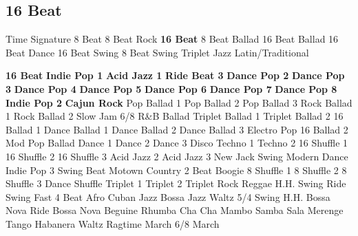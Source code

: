 \subsection{16 Beat}
Time Signature
8 Beat
8 Beat Rock
\textbf{16 Beat}
8 Beat Ballad
16 Beat Ballad
16 Beat Dance
16 Beat Swing
8 Beat Swing
Triplet
Jazz
Latin/Traditional





























\textbf{16 Beat}
\textbf{Indie Pop 1}
\textbf{Acid Jazz 1}
\textbf{Ride Beat 3}
\textbf{Dance Pop 2}
\textbf{Dance Pop 3}
\textbf{Dance Pop 4}
\textbf{Dance Pop 5}
\textbf{Dance Pop 6}
\textbf{Dance Pop 7}
\textbf{Dance Pop 8}
\textbf{Indie Pop 2}
\textbf{Cajun Rock}
Pop Ballad 1
Pop Ballad 2
Pop Ballad 3
Rock Ballad 1
Rock Ballad 2
Slow Jam
6/8 R\&B Ballad
Triplet Ballad 1
Triplet Ballad 2
16 Ballad 1
Dance Ballad 1
Dance Ballad 2
Dance Ballad 3
Electro Pop
16 Ballad 2
Mod Pop Ballad
Dance 1
Dance 2
Dance 3
Disco
Techno 1
Techno 2
16 Shuffle 1
16 Shuffle 2
16 Shuffle 3
Acid Jazz 2
Acid Jazz 3
New Jack Swing
Modern Dance
Indie Pop 3
Swing Beat
Motown
Country 2 Beat
Boogie
8 Shuffle 1
8 Shuffle 2
8 Shuffle 3
Dance Shuffle
Triplet 1
Triplet 2
Triplet Rock
Reggae
H.H. Swing
Ride Swing
Fast 4 Beat
Afro Cuban
Jazz Bossa
Jazz Waltz
5/4 Swing
H.H. Bossa Nova
Ride Bossa Nova
Beguine
Rhumba
Cha Cha
Mambo
Samba
Sala
Merenge
Tango
Habanera
Waltz
Ragtime
March
6/8 March
